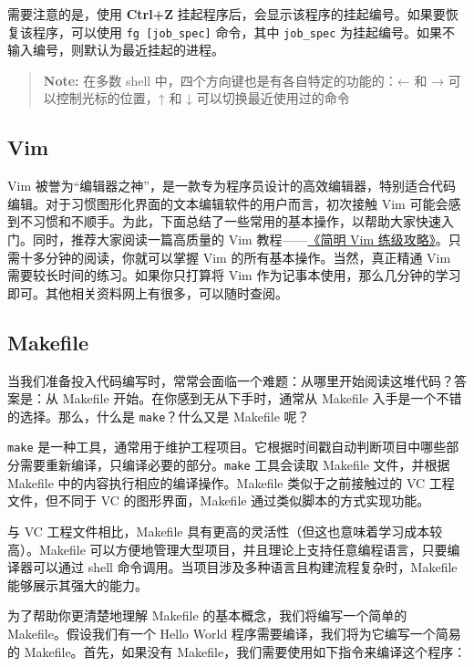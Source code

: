 需要注意的是，使用 \textbf{Ctrl+Z} 挂起程序后，会显示该程序的挂起编号。如果要恢复该程序，可以使用 \texttt{fg\ {[}job\_spec{]}} 命令，其中 \texttt{job\_spec} 为挂起编号。如果不输入编号，则默认为最近挂起的进程。

\begin{quote}
\textbf{Note:} 在多数 shell 中，四个方向键也是有各自特定的功能的：← 和 → 可以控制光标的位置，↑ 和 ↓ 可以切换最近使用过的命令
\end{quote}

\subsection{Vim}\label{sec:01-hardware-preparation-003}

Vim 被誉为``编辑器之神''，是一款专为程序员设计的高效编辑器，特别适合代码编辑。对于习惯图形化界面的文本编辑软件的用户而言，初次接触 Vim 可能会感到不习惯和不顺手。为此，下面总结了一些常用的基本操作，以帮助大家快速入门。同时，推荐大家阅读一篇高质量的 Vim 教程------\href{http://coolshell.cn/articles/5426.html/}{《简明 Vim 练级攻略》}。只需十多分钟的阅读，你就可以掌握 Vim 的所有基本操作。当然，真正精通 Vim 需要较长时间的练习。如果你只打算将 Vim 作为记事本使用，那么几分钟的学习即可。其他相关资料网上有很多，可以随时查阅。

\subsection{Makefile}\label{sec:01-hardware-preparation-004}

当我们准备投入代码编写时，常常会面临一个难题：从哪里开始阅读这堆代码？答案是：从 Makefile 开始。在你感到无从下手时，通常从 Makefile 入手是一个不错的选择。那么，什么是 \texttt{make}？什么又是 Makefile 呢？

\texttt{make} 是一种工具，通常用于维护工程项目。它根据时间戳自动判断项目中哪些部分需要重新编译，只编译必要的部分。\texttt{make} 工具会读取 Makefile 文件，并根据 Makefile 中的内容执行相应的编译操作。Makefile 类似于之前接触过的 VC 工程文件，但不同于 VC 的图形界面，Makefile 通过类似脚本的方式实现功能。

与 VC 工程文件相比，Makefile 具有更高的灵活性（但这也意味着学习成本较高）。Makefile 可以方便地管理大型项目，并且理论上支持任意编程语言，只要编译器可以通过 shell 命令调用。当项目涉及多种语言且构建流程复杂时，Makefile 能够展示其强大的能力。

为了帮助你更清楚地理解 Makefile 的基本概念，我们将编写一个简单的 Makefile。假设我们有一个 Hello World 程序需要编译，我们将为它编写一个简易的 Makefile。首先，如果没有 Makefile，我们需要使用如下指令来编译这个程序：

